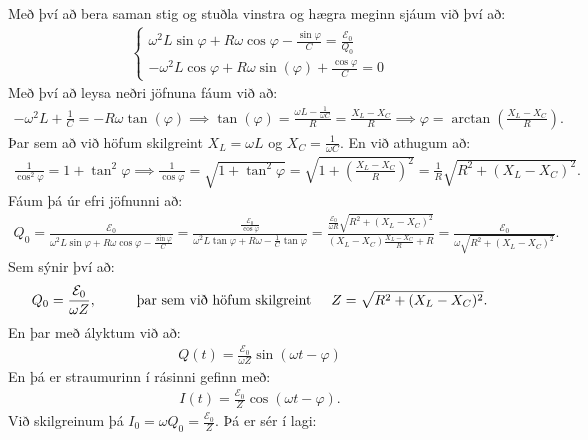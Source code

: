 Með því að bera saman stig og stuðla vinstra og hægra meginn sjáum við því að:
\begin{align*}
    \begin{cases}
    \omega^2 L \sin\varphi + R\omega \cos\varphi - \frac{\sin\varphi}{C} = \frac{\mathcal{E}_0}{Q_0} \\[10pt]
    -\omega^2 L \cos\varphi + R\omega \sin(\varphi) + \frac{\cos\varphi}{C} = 0
    \end{cases}
\end{align*}
Með því að leysa neðri jöfnuna fáum við að:
\begin{align*}
    -\omega^2 L + \frac{1}{C} = -R\omega \tan(\varphi) \implies \tan(\varphi) = \frac{\omega L - \frac{1}{\omega C}}{R} = \frac{X_L - X_C}{R} \implies \varphi = \arctan(\frac{X_L - X_C}{R}).
\end{align*}
Þar sem að við höfum skilgreint $X_L = \omega L$ og $X_C = \frac{1}{\omega C}$. En við athugum að:
\begin{align*}
    \frac{1}{\cos^2\varphi} = 1 + \tan^2\varphi \implies \frac{1}{\cos\varphi} = \sqrt{1 + \tan^2\varphi} = \sqrt{1 + \left( \frac{X_L- X_C}{R} \right)^2} = \frac{1}{R}\sqrt{R^2 + (X_L - X_C)^2}.
\end{align*}
Fáum þá úr efri jöfnunni að:
\begin{align*}
    Q_0 = \frac{\mathcal{E}_0}{\omega^2 L \sin\varphi + R\omega \cos\varphi - \frac{\sin\varphi}{C}} = \frac{\frac{\mathcal{E}_0}{\cos\varphi}}{\omega^2 L \tan\varphi + R\omega - \frac{1}{C}\tan\varphi} = \frac{\frac{\mathcal{E}_0}{\omega R}\sqrt{R^2 + (X_L - X_C)^2}}{(X_L - X_C) \frac{X_L-X_C}{R} + R} = \frac{\mathcal{E}_0}{\omega \sqrt{R^2 + (X_L-X_C)^2}}.
\end{align*}
Sem sýnir því að:
\begin{align*}
    Q_0 = \frac{\mathcal{E}_0}{\omega Z}, \hspace{1cm} \text{þar sem við höfum skilgreint} \hspace{0.5cm} Z = \sqrt{R^2 + (X_L - X_C)^2}.
\end{align*}
En þar með ályktum við að:
\begin{align*}
    Q(t) = \frac{\mathcal{E}_0}{\omega Z} \sin(\omega t - \varphi)
\end{align*}
En þá er straumurinn í rásinni gefinn með:
\begin{align*}
    I(t) = \frac{\mathcal{E}_0}{Z}\cos(\omega t - \varphi).
\end{align*}
Við skilgreinum þá $I_0 = \omega Q_0 = \frac{\mathcal{E}_0}{Z}$. Þá er sér í lagi:
